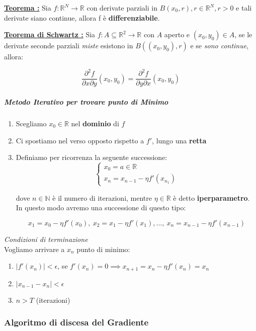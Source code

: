 \documentclass[a4paper,12pt]{article}
\newcommand{\teorema}[1]{\noindent\textbf{\underline{Teorema #1 :}} }
\begin{document}
	\teorema{} Sia $f : \mathbb{R}^N \rightarrow \mathbb{R}$ con derivate parziali in $B(x_0,r), r \in \mathbb{R}^N, r>0$ e tali derivate siano continue, allora f è \textbf{differenziabile}.

	\teorema{di Schwartz} Sia $f : A \subseteq \mathbb{R}^2 \rightarrow \mathbb{R}$ con $A$ aperto e $(x_0,y_0) \in A$, se le derivate seconde parziali \textit{miste} esistono in $B((x_0,y_0), r)$ e se \textit{sono continue}, allora:

	\[
	\frac{\partial^2 f}{\partial x \partial y} (x_0,y_0) = \frac{\partial^2 f}{\partial y \partial x} (x_0,y_0)
	\]

	\subparagraph{Metodo Iterativo per trovare punto di Minimo}

	\begin{enumerate}
		\item Scegliamo $x_0 \in \mathbb{R}$ nel \textbf{dominio} di $f$
		\item Ci spostiamo nel verso opposto rispetto a $f'$, lungo una \textbf{retta}
		\item Definiamo per ricorrenza la seguente successione:
		\[
		\begin{cases}
			x_0 = a \in \mathbb{R} \\
			x_n = x_{n-1} - \eta f'(x_{n_1})
		\end{cases}
		\]

		dove $n \in \mathbb{N}$ è il numero di iterazioni, mentre $\eta \in \mathbb{R}$ è detto \textbf{iperparametro}. In questo modo avremo una successione di questo tipo:

		\[
		x_1 = x_0 - \eta f'(x_0), \ x_2 = x_1 - \eta f'(x_1), ..., \ x_n = x_{n-1} - \eta f'(x_{n-1})
		\]
	\end{enumerate}

	\textit{Condizioni di terminazione} \\
	Vogliamo arrivare a $x_n$ punto di minimo:

	\begin{enumerate}
		\item $|f'(x_n)| < \epsilon $, se $f'(x_n) = 0 \implies x_{n+1} = x_n - \eta f'(x_n) = x_n$
		\item $|x_{n-1} - x_n| < \epsilon$
		\item $n > T$ (iterazioni)
	\end{enumerate}

	\subsubsection{Algoritmo di discesa del Gradiente}
\end{document}
